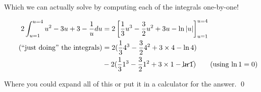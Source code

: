 \begin{solution}
    Which we can actually solve by computing each of the integrals one-by-one!

    \begin{align*}
        2 \int_{u=1}^{u=4}u^2- 3 u + 3 - \frac{1}{u} du &= 2\left[ \frac{1}{3}u^3 - \frac{3}{2}u^2 + 3u - \ln |u|\right]_{u=1}^{u=4} \\ \tag{``just doing'' the integrals}
         &= 2(\frac{1}{3}4^3 - \frac{3}{2}4^2 + 3\times4 - \ln 4)\\
         &- 2(\frac{1}{3}1^3 - \frac{3}{2}1^2 + 3\times1 - \cancel{\ln 1}) \tag{using $\ln 1 = 0$}
    \end{align*}

    Where you could expand all of this or put it in a calculator for the answer.
    \qed
\end{solution}

